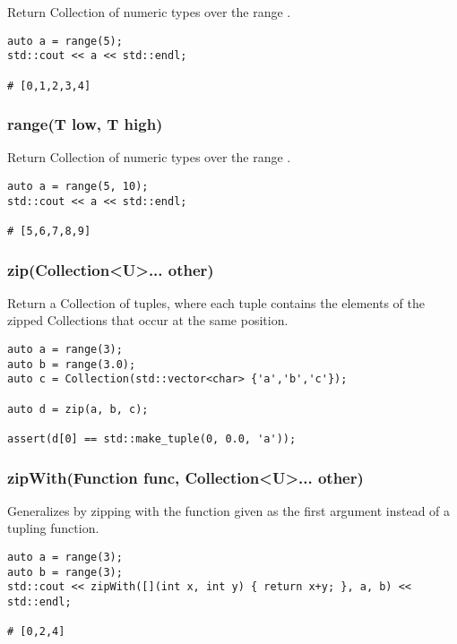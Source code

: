Return Collection of numeric types over the range \code{[0, size)}.

\begin{lstlisting}[title=example]
auto a = range(5);
std::cout << a << std::endl;

# [0,1,2,3,4]
\end{lstlisting}




\subsubsection{range(T low, T high)}

Return Collection of numeric types over the range \code{[low, high)}.

\begin{lstlisting}[title=example]
auto a = range(5, 10);
std::cout << a << std::endl;

# [5,6,7,8,9]
\end{lstlisting}





\subsubsection{zip(Collection<U>... other)}

Return a Collection of tuples, where each tuple contains the elements of the zipped Collections that occur at the same position.

\begin{lstlisting}[title=example]
auto a = range(3);
auto b = range(3.0);
auto c = Collection(std::vector<char> {'a','b','c'});

auto d = zip(a, b, c);

assert(d[0] == std::make_tuple(0, 0.0, 'a'));
\end{lstlisting}




\subsubsection{zipWith(Function func, Collection<U>... other)}
Generalizes  by zipping with the function given as the first argument instead of a tupling function.

\begin{lstlisting}[title=example]
auto a = range(3);
auto b = range(3);
std::cout << zipWith([](int x, int y) { return x+y; }, a, b) << std::endl;

# [0,2,4]
\end{lstlisting}


